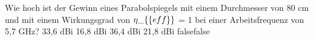     {Wie hoch ist der Gewinn eines Parabolspiegels mit einem Durchmesser von 80 cm und mit einem Wirkungsgrad von $\eta\_\{\textrm\{eff\}\}$ = 1 bei einer Arbeitsfrequenz von 5,7 GHz?}
    {33,6 dBi}
    {16,8 dBi}
    {36,4 dBi}
    {21,8 dBi}
    {false}{false}